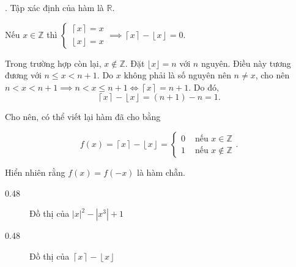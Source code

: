 . Tập xác định của hàm là $\mathbb{R}$.

Nếu \textcolor{colorEmphasisCyan}{$x \in \mathbb{Z}$} thì $\begin{cases}
   \left\lceil x \right\rceil = x \\ 
   \left\lfloor x \right\rfloor = x
\end{cases} \implies \left\lceil x \right\rceil - \left\lfloor x \right\rfloor = 0$.

Trong trường hợp còn lại, \textcolor{colorEmphasis}{$x \notin \mathbb{Z}$}. Đặt $\lfloor x \rfloor = n$ với $n$ nguyên. Điều này tương đương với $n \leq x < n + 1$. Do $x$ không phải là số nguyên nên $n \neq x$, cho nên $n < x < n + 1 \implies n < x \leq n + 1 \iff \left\lceil x \right\rceil = n + 1$. Do đó, $$\left\lceil x \right\rceil - \left\lfloor x \right\rfloor = (n + 1) - n = 1.$$

Cho nên, có thể viết lại hàm đã cho bằng

\begin{equation*}
   f(x) = \left\lceil x \right\rceil - \left\lfloor x \right\rfloor = \begin{cases}
      0 & \text{ nếu } x \in \mathbb{Z} \\
      1 & \text{ nếu } x \notin \mathbb{Z}
   \end{cases}.
\end{equation*}

Hiển nhiên rằng $f(x) = f(-x)$ là hàm chẵn.

{
   \begin{minipageindent}{0.48\textwidth}
      \begin{figure}[H]
         \centering
         \caption{Đồ thị của $|x|^2 - \left|x^3\right| + 1$}
      \end{figure}
   \end{minipageindent}
   \hfill
   \begin{minipageindent}{0.48\textwidth}
      \begin{figure}[H]
         \centering
         \caption{Đồ thị của $\left\lceil x \right\rceil - \left\lfloor x \right\rfloor$}
      \end{figure}
   \end{minipageindent}
}

